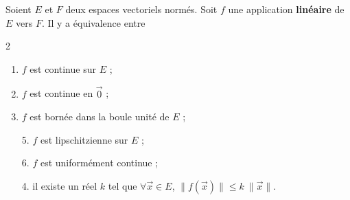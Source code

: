 \begin{thm}
	Soient $E$\/ et $F$\/ deux espaces vectoriels normés. Soit $f$\/ une application \textbf{linéaire} de $E$\/ vers $F$. Il y a équivalence entre
	\begin{multicols}2
		\begin{enumerate}
			\item $f$\/ est continue sur $E$\/ ;
			\item $f$\/ est continue en $\vec{0}$ ;
			\item $f$\/ est bornée dans la boule unité de $E$\/ ;
			\item[5.] $f$\/ est lipschitzienne sur $E$\/ ;
			\item[6.] $f$\/ est uniformément continue ;
			\item[4.] il existe un réel $k$\/ tel que $\forall \vec{x} \in E$, $\|f(\vec{x})\| \le k\:\|\vec{x}\|$.
		\end{enumerate}
	\end{multicols}
\end{thm}

